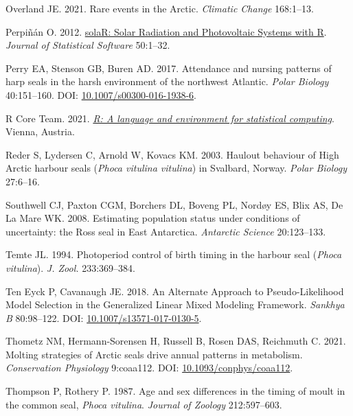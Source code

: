 \documentclass[fleqn,10pt,lineno]{wlpeerj} %
\newlength{\cslhangindent}
\newlength{\cslentryspacingunit} %
\newenvironment{CSLReferences}[2] %
 {%
  \setlength{\parindent}{0pt}
  \ifodd #1
  \let\oldpar\par
  \def\par{\hangindent=\cslhangindent\oldpar}
  \fi
  \setlength{\parskip}{#2\cslentryspacingunit}
 }%
 {}
\begin{document}
\begin{CSLReferences}{1}{0}
\leavevmode{}%
Overland JE. 2021. Rare events in the Arctic. \emph{Climatic Change} 168:1--13.

\leavevmode{}%
Perpiñán O. 2012. \href{http://www.jstatsoft.org/v50/i09/}{solaR: Solar Radiation and Photovoltaic Systems with R}. \emph{Journal of Statistical Software} 50:1--32.

\leavevmode{}%
Perry EA, Stenson GB, Buren AD. 2017. Attendance and nursing patterns of harp seals in the harsh environment of the northwest Atlantic. \emph{Polar Biology} 40:151--160. DOI: \href{https://doi.org/10.1007/s00300-016-1938-6}{10.1007/s00300-016-1938-6}.

\leavevmode{}%
R Core Team. 2021. \emph{\href{https://www.R-project.org/}{R: A language and environment for statistical computing}}. Vienna, Austria.

\leavevmode{}%
Reder S, Lydersen C, Arnold W, Kovacs KM. 2003. Haulout behaviour of High Arctic harbour seals (\emph{Phoca vitulina vitulina}) in Svalbard, Norway. \emph{Polar Biology} 27:6--16.

\leavevmode{}%
Southwell CJ, Paxton CGM, Borchers DL, Boveng PL, Nordøy ES, Blix AS, De La Mare WK. 2008. Estimating population status under conditions of uncertainty: the Ross seal in East Antarctica. \emph{Antarctic Science} 20:123--133.

\leavevmode{}%
Temte JL. 1994. Photoperiod control of birth timing in the harbour seal (\emph{Phoca vitulina}). \emph{J. Zool.} 233:369--384.

\leavevmode{}%
Ten Eyck P, Cavanaugh JE. 2018. An Alternate Approach to Pseudo-Likelihood Model Selection in the Generalized Linear Mixed Modeling Framework. \emph{Sankhya B} 80:98--122. DOI: \href{https://doi.org/10.1007/s13571-017-0130-5}{10.1007/s13571-017-0130-5}.

\leavevmode{}%
Thometz NM, Hermann-Sorensen H, Russell B, Rosen DAS, Reichmuth C. 2021. Molting strategies of Arctic seals drive annual patterns in metabolism. \emph{Conservation Physiology} 9:coaa112. DOI: \href{https://doi.org/10.1093/conphys/coaa112}{10.1093/conphys/coaa112}.

\leavevmode{}%
Thompson P, Rothery P. 1987. Age and sex differences in the timing of moult in the common seal, \emph{Phoca vitulina}. \emph{Journal of Zoology} 212:597--603.


\end{CSLReferences}
\end{document}
